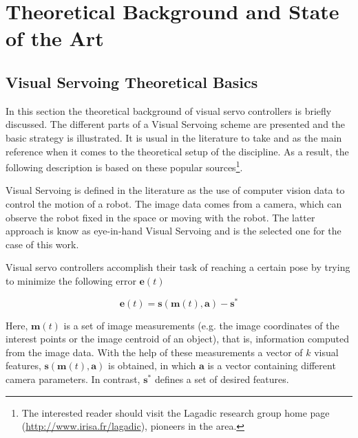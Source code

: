 
\chapter{Theoretical Background and State of the Art}
\label{chap:theory-state-art}

\section{Visual Servoing Theoretical Basics}
\label{sec:vs-theory}

In this section the theoretical background of visual servo controllers is briefly discussed. The different parts of a Visual Servoing scheme are presented and the basic strategy is illustrated. It is usual in the literature to take \cite{chaumette_visual_2006} and \cite{chaumette_visual_2007} as the main reference when it comes to the theoretical setup of the discipline. As a result, the following description is based on these popular sources\footnote{The interested reader should visit the Lagadic research group home page (\url{http://www.irisa.fr/lagadic}), pioneers in the area.}.

Visual Servoing is defined in the literature as the use of computer vision data to control the motion of a robot. The image data comes from a camera, which can observe the robot fixed in the space or moving with the robot. The latter approach is know as eye-in-hand Visual Servoing and is the selected one for the case of this work.


Visual servo controllers accomplish their task of reaching a certain pose by trying to minimize the following error $\bm{e}(t)$

\begin{equation}
\bm{e}(t) = \bm{s}(\bm{m}(t), \bm{a}) - \bm{s}^\ast
\label{eq:vs-th-1}
\end{equation}

Here, $\bm{m}(t)$ is a set of image measurements (e.g. the image coordinates of the interest points or the image centroid of an object), that is, information computed from the image data. With the help of these measurements a vector of $k$ visual features, $\bm{s}(\bm{m}(t), \bm{a})$ is obtained, in which $\bm{a}$ is a vector containing different camera parameters. In contrast, $\bm{s}^\ast$ defines a set of desired features.

